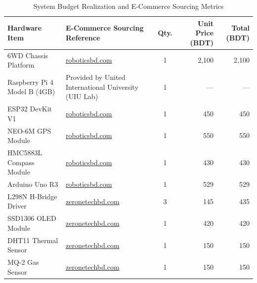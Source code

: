 \documentclass[conference]{IEEEtran}
\begin{document}
\begin{table}[t]
\caption{System Budget Realization and E-Commerce Sourcing Metrics}
\begin{center}
\begin{tabular}{llcrr}
\toprule
\textbf{Hardware Item} & \textbf{E-Commerce Sourcing Reference} & \textbf{Qty.} & \textbf{Unit Price (BDT)} & \textbf{Total (BDT)} \\
\midrule
6WD Chassis Platform      & \href{https://store.roboticsbd.com/robot-platform-chassis-Bangladesh/882-6wd-robotics-rover-diy-blue-chassis-with-motors-wheels-robotics-bangladesh.html}{roboticsbd.com}                         & 1 & 2,100 & 2,100 \\
Raspberry Pi 4 Model B (4GB) & Provided by United International University (UIU Lab)                                          & 1 & ---   & ---   \\
ESP32 DevKit V1           & \href{https://store.roboticsbd.com/development-boards/948-esp32-esp-32s-30p-nodemcu-development-board-wireless-wifi-robotics-bangladesh.html}{roboticsbd.com}                         & 1 &   450 &   450 \\
NEO-6M GPS Module         & \href{https://store.roboticsbd.com/gsm-gprs-gps-3g-robotics-bangladesh/3280-gy-neo-6m-v2-flight-control-gps-module-new-robotics-bangladesh.html}{roboticsbd.com}                       & 1 & 550 & 550 \\
HMC5883L Compass Module   & \href{https://store.roboticsbd.com/imugyrocompass/3404-compass-sensor-hmc5883l-hw-127-robotics-bangladesh.html}{roboticsbd.com}                 & 1 &   430 &   430 \\
Arduino Uno R3            & \href{https://store.roboticsbd.com/development-boards/323-arduino-uno-r3-smd-robotics-bangladesh.html}{roboticsbd.com}  & 1 &   529 &   529 \\
L298N H-Bridge Driver     & \href{https://www.zeronetechbd.com/product/details/l298n-h-bridge-dual-dc-motor-driver-modulemdm002}{zeronetechbd.com}               & 3 &   145 &   435 \\
SSD1306 OLED Module       & \href{https://www.zeronetechbd.com/product/details/oled-display-13-4-pindol002}{zeronetechbd.com}       & 1 &   420 &   420 \\
DHT11 Thermal Sensor      & \href{https://www.zeronetechbd.com/product/details/dht11-temperature-humidity-sensor-modulesnm037}{zeronetechbd.com}& 1 &   150 &   150 \\
MQ-2 Gas Sensor           & \href{https://www.zeronetechbd.com/product/details/smoke-sensor-module-mq-2snm007}{zeronetechbd.com}                 & 1 &   150 &   150 \\

\end{tabular}
\end{center}
\end{table}
\end{document}
